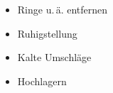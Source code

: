 \label{m:ehi-verstauchung}
\begin{itemize}
  \item Ringe u.\,ä. entfernen
  \item Ruhigstellung
  \item Kalte Umschläge
  \item Hochlagern %
\end{itemize}